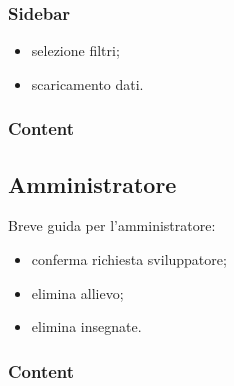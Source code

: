 \subsubsection{Sidebar}
\begin{itemize}
\item selezione filtri;
\item scaricamento dati.
\end{itemize}
\subsubsection{Content}
\subsection{Amministratore}
Breve guida per l'amministratore:
\begin{itemize}
\item conferma richiesta sviluppatore;
\item elimina allievo;
\item elimina insegnate.
\end{itemize}
\subsubsection{Content}
